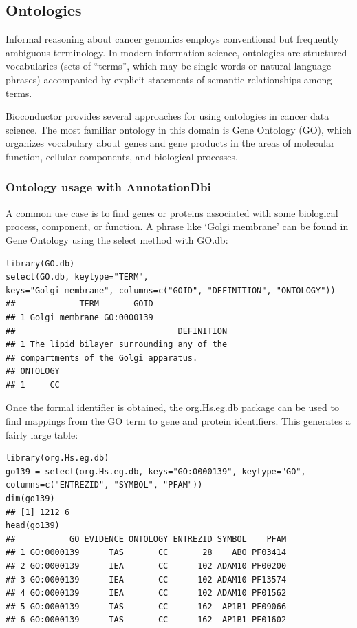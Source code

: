 \documentclass[graybox]{svmult}
\begin{document}
\subsection{Ontologies}\label{ontologies}

Informal reasoning about cancer genomics employs conventional
but frequently ambiguous terminology. In modern
information science, ontologies are structured vocabularies
(sets of ``terms'', which may be single words or natural language
phrases) accompanied by
explicit statements of semantic relationships among terms.

Bioconductor provides several approaches for using ontologies
in cancer data science. The most familiar ontology
in this domain is Gene Ontology (GO), which organizes vocabulary
about genes and gene products in
the areas of molecular function, cellular components, and
biological processes.

\subsubsection{Ontology usage with AnnotationDbi}\label{ontology-usage-with-annotationdbi}

A common use case is to find genes or proteins associated
with some biological process, component, or function.
A phrase like `Golgi membrane' can be found in Gene Ontology
using the select method with GO.db:

\begin{shaded}
\begin{verbatim}
library(GO.db)
select(GO.db, keytype="TERM",
keys="Golgi membrane", columns=c("GOID", "DEFINITION", "ONTOLOGY"))
##             TERM       GOID
## 1 Golgi membrane GO:0000139
##                                 DEFINITION
## 1 The lipid bilayer surrounding any of the 
## compartments of the Golgi apparatus.
## ONTOLOGY
## 1     CC
\end{verbatim}
\end{shaded}

Once the formal identifier is obtained, the org.Hs.eg.db package can be used to find mappings
from the GO term to gene and protein identifiers. This generates a fairly large table:

\begin{shaded}
\begin{verbatim}
library(org.Hs.eg.db)
go139 = select(org.Hs.eg.db, keys="GO:0000139", keytype="GO",
columns=c("ENTREZID", "SYMBOL", "PFAM"))
dim(go139)
## [1] 1212 6
head(go139)
##           GO EVIDENCE ONTOLOGY ENTREZID SYMBOL    PFAM
## 1 GO:0000139      TAS       CC       28    ABO PF03414
## 2 GO:0000139      IEA       CC      102 ADAM10 PF00200
## 3 GO:0000139      IEA       CC      102 ADAM10 PF13574
## 4 GO:0000139      IEA       CC      102 ADAM10 PF01562
## 5 GO:0000139      TAS       CC      162  AP1B1 PF09066
## 6 GO:0000139      TAS       CC      162  AP1B1 PF01602
\end{verbatim}
\end{shaded}
\end{document}

